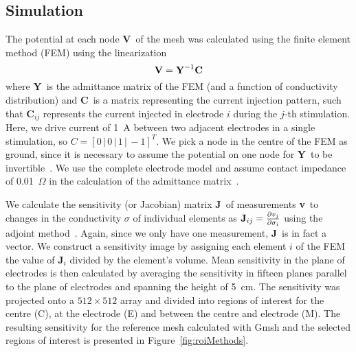 \documentclass[12pt]{iopart}
\newcommand{\VB}{{\mbox{\bf V}}}
\newcommand{\YB}{{\mbox{\bf Y}}}
\newcommand{\CB}{{\mbox{\bf C}}}
\newcommand{\JB}{{\mbox{\bf J}}}
\newcommand{\vB}{{\mbox{\bf v}}}
\begin{document}
\subsection{Simulation}
The potential at each node \VB\ of the mesh was calculated using the finite
element method (FEM) using the linearization 
\begin{equation}
\VB = \YB^{-1}\CB
\end{equation}
where \YB\ is the admittance matrix of the FEM (and a function of conductivity
distribution) and \CB\ is a matrix representing the current injection pattern,
such that \CB$_{ij}$ represents the current injected in electrode $i$ during
the $j$-th stimulation. Here, we drive current of 1~A between two adjacent
electrodes in a single stimulation, so $C = [0\,|\,0\,|\,1\,|\,-1]^T$. 
We pick a node in the centre of the FEM as ground, since it is necessary to
assume the potential on
one node for \YB\ to be invertible~\parencite{Adler1996a}.
We use the complete electrode model and assume contact impedance of
0.01~$\Omega$ in the calculation of the admittance
matrix~\parencite{polydorides_electrode_2002}. 


We calculate the sensitivity (or Jacobian) matrix \JB\ of measurements \vB\ to
changes in the conductivity $\sigma$ of individual elements as
$\JB_{ij}=\frac{\partial v_j}{\partial \sigma_i}$ using the adjoint
method~\parencite{polydorides_electrode_2002}. Again, since we only have one measurement, \JB\
is in fact a vector.
We construct a sensitivity image by assigning each element
$i$ of the FEM the value of \JB$_i$ divided by the element's volume.
Mean sensitivity in the plane of electrodes is then calculated by averaging
the sensitivity in fifteen planes parallel to the plane of electrodes and
spanning the height of 5~cm. 
The sensitivity was projected onto a $512\times512$ array and divided into regions
of interest for the centre (C), at the electrode (E) and between the centre and electrode
(M). The resulting sensitivity for the reference mesh calculated with Gmsh and the 
selected regions of interest is presented in Figure~\ref{fig:roiMethods}.
\end{document}
